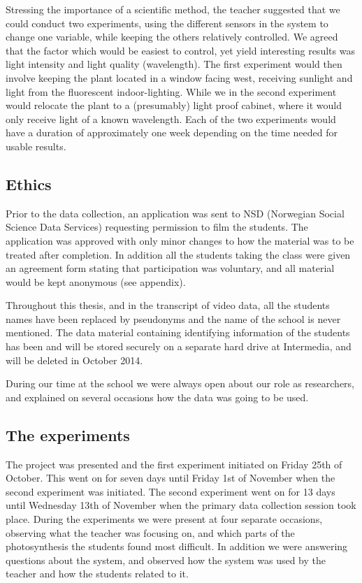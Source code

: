 Stressing the importance of a scientific method, the teacher suggested that we could conduct two experiments, using the different sensors in the system to change one variable, while keeping the others relatively controlled. We agreed that the factor which would be easiest to control, yet yield interesting results was light intensity and light quality (wavelength). The first experiment would then involve keeping the plant located in a window facing west, receiving sunlight and light from the fluorescent indoor-lighting. While we in the second experiment would relocate the plant to a (presumably) light proof cabinet, where it would only receive light of a known wavelength. Each of the two experiments would have a duration of approximately one week depending on the time needed for usable results. 

\subsection{Ethics}
Prior to the data collection, an application was sent to NSD (Norwegian Social Science Data Services) requesting permission to film the students. The application was approved with only minor changes to how the material was to be treated after completion. In addition all the students taking the class were given an agreement form stating that participation was voluntary, and all material would be kept anonymous (see appendix). 

Throughout this thesis, and in the transcript of video data, all the students names have been replaced by pseudonyms and the name of the school is never mentioned. The data material containing identifying information of the students has been and will be stored securely on a separate hard drive at Intermedia, and will be deleted in October 2014. 

During our time at the school we were always open about our role as researchers, and explained on several occasions how the data was going to be used. 

\subsection{The experiments}
The project was presented and the first experiment initiated on Friday 25th of October. This went on for seven days until Friday 1st of November when the second experiment was initiated. The second experiment went on for 13 days until Wednesday 13th of November when the primary data collection session took place. During the experiments we were present at four separate occasions, observing what the teacher was focusing on, and which parts of the photosynthesis the students found most difficult. In addition we were answering questions about the system, and observed how the system was used by the teacher and how the students related to it. 

